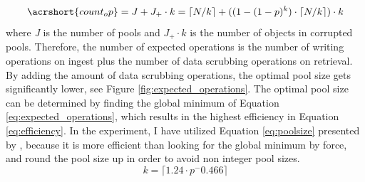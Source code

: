 \documentclass[final]{vutinfth}
\begin{document}
\begin{equation}\label{eq:expected_operations}
    \acrshort{count_op} = J + J_+ \cdot k = \lceil N/k \rceil + ((1-(1-p)^k)\cdot \lceil N/k \rceil) \cdot k
\end{equation}
where \textit{J} is the number of pools and \textit{$J_+ \cdot k$} is the number of objects in corrupted pools. Therefore, the number of expected operations is the number of writing operations on ingest plus the number of data scrubbing operations on retrieval. By adding the amount of data scrubbing operations, the optimal pool size gets significantly lower, see Figure \ref{fig:expected_operations}. The optimal pool size  can be determined by finding the global minimum of Equation \ref{eq:expected_operations}, which results in the highest efficiency in Equation \ref{eq:efficiency}.
In the experiment, I have utilized Equation \ref{eq:poolsize} presented by \cite[3]{regen2020simple}, because it is more efficient than looking for the global minimum by force, and round the pool size up in order to avoid non integer pool sizes.
\begin{equation}\label{eq:poolsize}
    k = \lceil 1.24\cdot p^-0.466 \rceil
\end{equation}
\end{document}
